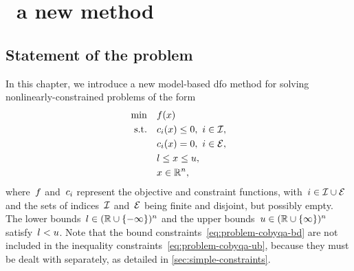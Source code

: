 %
%
%
\chapter{ \textemdash\ a new  method}
\label{ch:cobyqa-introduction}

\section{Statement of the problem}

In this chapter, we introduce a new model-based \gls{dfo} method for solving nonlinearly-constrained problems of the form
\begin{subequations}
    \label{eq:problem-cobyqa}
    \begin{align}
        \min        & \quad \obj(\iter) \label{eq:problem-cobyqa-obj}\\
        \text{s.t.} & \quad \con{i}(\iter) \le 0, ~ i \in \iub, \label{eq:problem-cobyqa-ub}\\
                    & \quad \con{i}(\iter) = 0, ~ i \in \ieq, \label{eq:problem-cobyqa-eq}\\
                    & \quad \xl \le x \le \xu, \label{eq:problem-cobyqa-bd}\\
                    & \quad \iter \in \R^n, \nonumber
    \end{align}
\end{subequations}
where~$f$ and~$c_{i}$ represent the objective and constraint functions, with~$i \in \mathcal{I} \cup \mathcal{E}$ and the sets of indices~$\mathcal{I}$ and~$\mathcal{E}$ being finite and disjoint, but possibly empty. 
The lower bounds~$l \in (\mathbb{R} \cup \{-\infty\})^n$ and the upper bounds~$u \in (\mathbb{R} \cup \{\infty\})^n$ satisfy~$l < u$.
Note that the bound constraints~\cref{eq:problem-cobyqa-bd} are not included in the inequality constraints~\cref{eq:problem-cobyqa-ub}, because they must be dealt with separately, as detailed in \cref{sec:simple-constraints}.


